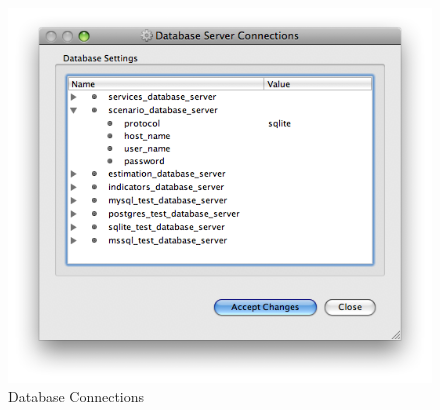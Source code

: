 \begin{figure}[htp]
\begin{center}
\includegraphics[scale=0.6]{part-gui/images/menu-bar-database-connections.png}
\end{center}
\caption{Database Connections}
\label{fig:menu-bar-database-connections}
\end{figure}
